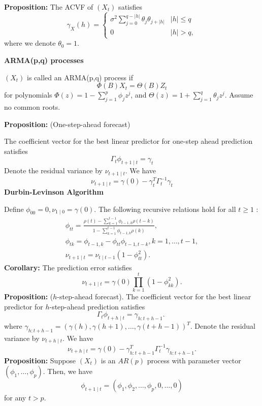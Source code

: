 \documentclass[a4paper]{article}
\newcommand{\subheading}[1]{{\scriptsize\textbf{#1}}}
\begin{document}
\begin{multicols*}{4}
\textbf{Proposition:} The ACVF of $\left(X_{t}\right)$ satisfies
$$
\gamma_{X}(h)= \begin{cases}\sigma^{2} \sum_{j=0}^{q-|h|} \theta_{j} \theta_{j+|h|} & |h| \leq q \\ 0 & |h|>q,\end{cases}
$$
where we denote $\theta_{0}=1$.

\smallskip
\hline
\smallskip

\subheading{ARMA(p,q) processes}

$\left(X_{t}\right)$ is called an ARMA(p,q) process if
$$
\Phi(B) X_{t}=\Theta(B) Z_{t}
$$
for polynomials $\Phi(z)=1-\sum_{j=1}^{p} \phi_{j} z^{j}$, and $\Theta(z)=1+\sum_{j=1}^{q} \theta_{j} z^{j}$. Assume no common roots.

\smallskip
\hline
\smallskip

\textbf{Proposition:} (One-step-ahead forecast) 

The coefficient vector for the best linear predictor for one-step ahead prediction satisfies
$$
\Gamma_{t} \phi_{t+1 \mid t}=\gamma_{t}
$$
Denote the residual variance by $\nu_{t+1 \mid t}$. We have
$$
\nu_{t+1 \mid t}=\gamma(0)-\gamma_{t}^{T} \Gamma_{t}^{-1} \gamma_{t}
$$
\subheading{Durbin-Levinson Algorithm}

Define $\phi_{00}=0, \nu_{1 \mid 0}=\gamma(0)$. The following recursive relations hold for all $t \geq 1$ :
$$
\begin{gathered}
\phi_{t t}=\frac{\rho(t)-\sum_{k=1}^{t-1} \phi_{t-1, k} \rho(t-k)}{1-\sum_{k=1}^{t-1} \phi_{t-1, k} \rho(k)}, \\
\phi_{t k}=\phi_{t-1, k}-\phi_{t t} \phi_{t-1, t-k}, k=1, \ldots, t-1, \\
\nu_{t+1 \mid t}=\nu_{t \mid t-1}\left(1-\phi_{t t}^{2}\right) .
\end{gathered}
$$
\textbf{Corollary:} The prediction error satisfies
$$
\nu_{t+1 \mid t}=\gamma(0) \prod_{k=1}^{t}\left(1-\phi_{k k}^{2}\right) .
$$
\textbf{Proposition:} ($h$-step-ahead forecast). The coefficient vector for the best linear predictor for $h$-step-ahead prediction satisfies
$$
\Gamma_{t} \phi_{t+h \mid t}=\gamma_{h: t+h-1} \text {. }
$$
where $\gamma_{h: t+h-1}=(\gamma(h), \gamma(h+1), \ldots, \gamma(t+h-1))^{T}$. Denote the residual variance by $\nu_{t+h \mid t}$. We have
$$
\nu_{t+h \mid t}=\gamma(0)-\gamma_{h: t+h-1}^{T} \Gamma_{t}^{-1} \gamma_{h: t+h-1} .
$$
\textbf{Proposition:} Suppose $\left(X_{t}\right)$ is an $A R(p)$ process with parameter vector $\left(\phi_{1}, \ldots, \phi_{p}\right)$. Then, we have
$$
\phi_{t+1 \mid t}=\left(\phi_{1}, \phi_{2}, \ldots, \phi_{p}, 0, \ldots, 0\right)
$$
for any $t>p$.
\smallskip
\hline
\smallskip



\end{multicols*}
\end{document}
